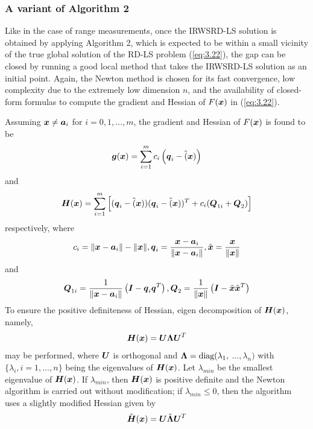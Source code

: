 \subsubsection{A variant of Algorithm 2}

Like in the case of range measurements, once the IRWSRD-LS solution is obtained by applying Algorithm 2, which is expected to be within a small vicinity of the true global solution of the RD-LS problem (\ref{eq:3.22}), the gap can be closed by running a good local method that takes the IRWSRD-LS solution as an initial point. Again, the Newton method is chosen for its fast convergence, low complexity due to the extremely low dimension $n$, and the availability of closed-form formulas to compute the gradient and Hessian of $F(\mbox{\boldmath$x$})$ in (\ref{eq:3.22}).

Assuming $\mbox{\boldmath$x$}\neq\mbox{\boldmath$a$}_i$ for $i = 0, 1,\ldots, m$, the gradient and Hessian of $F(\mbox{\boldmath$x$})$ is found to be
\begin{equation}
\nonumber
\mbox{\boldmath$g$}(\mbox{\boldmath$x$})=\sum_{i=1}^m c_i\left(\mbox{\boldmath$q$}_i - \tilde(\mbox{\boldmath$x$})\right)
\end{equation}
and
\begin{equation}
\nonumber
\mbox{\boldmath$H$}(\mbox{\boldmath$x$})=\sum_{i=1}^m \left[(\mbox{\boldmath$q$}_i-\tilde(\mbox{\boldmath$x$}))(\mbox{\boldmath$q$}_i-\tilde(\mbox{\boldmath$x$}))^T+c_i(\mbox{\boldmath$Q$}_{1i}+\mbox{\boldmath$Q$}_2)\right]
\end{equation}
respectively, where
\begin{equation}
\nonumber
c_i=\|\mbox{\boldmath$x$}-\mbox{\boldmath$a$}_i\|-\|\mbox{\boldmath$x$}\|, \mbox{\boldmath$q$}_i=\frac{\mbox{\boldmath$x$}-\mbox{\boldmath$a$}_i}{\|\mbox{\boldmath$x$}-\mbox{\boldmath$a$}_i\|}, \tilde{\mbox{\boldmath$x$}}=\frac{\mbox{\boldmath$x$}}{\|\mbox{\boldmath$x$}\|}
\end{equation}
and
\begin{equation}
\nonumber
\mbox{\boldmath$Q$}_{1i}=\frac{1}{\|\mbox{\boldmath$x$}-\mbox{\boldmath$a$}_i\|}\left(\mbox{\boldmath$I$}-\mbox{\boldmath$q$}_i\mbox{\boldmath$q$}^T\right), \mbox{\boldmath$Q$}_2=\frac{1}{\|\mbox{\boldmath$x$}\|}\left(\mbox{\boldmath$I$}-\tilde{\mbox{\boldmath$x$}}\tilde{\mbox{\boldmath$x$}}^T\right)
\end{equation}
To ensure the positive definiteness of Hessian, eigen decomposition of $\mbox{\boldmath$H$}(\mbox{\boldmath$x$})$, namely,
\begin{equation}
\nonumber
\mbox{\boldmath$H$}(\mbox{\boldmath$x$})=\mbox{\boldmath$U$}\mbox{\boldmath{$\Lambda$}}\mbox{\boldmath$U$}^T
\end{equation}
may be performed, where $\mbox{\boldmath$U$}$ is orthogonal and $\mbox{\boldmath{$\Lambda$}}=\mbox{diag}(\lambda_1,$ $\ldots,\lambda_n)$ with $\{\lambda_i, i=1,\ldots,n\}$ being the eigenvalues of $\mbox{\boldmath$H$}(\mbox{\boldmath$x$})$. Let $\lambda_{min}$ be the smallest eigenvalue of $\mbox{\boldmath$H$}(\mbox{\boldmath$x$})$. If $\lambda_{min}$, then $\mbox{\boldmath$H$}(\mbox{\boldmath$x$})$ is positive definite and the Newton algorithm is carried out without modification; if $\lambda_{min}\leq0$, then the algorithm uses a slightly modified Hessian given by
\begin{equation}
\nonumber
\tilde{\mbox{\boldmath$H$}}(\mbox{\boldmath$x$})=\mbox{\boldmath$U$}\tilde{\mbox{\boldmath{$\Lambda$}}}\mbox{\boldmath$U$}^T
\end{equation}
